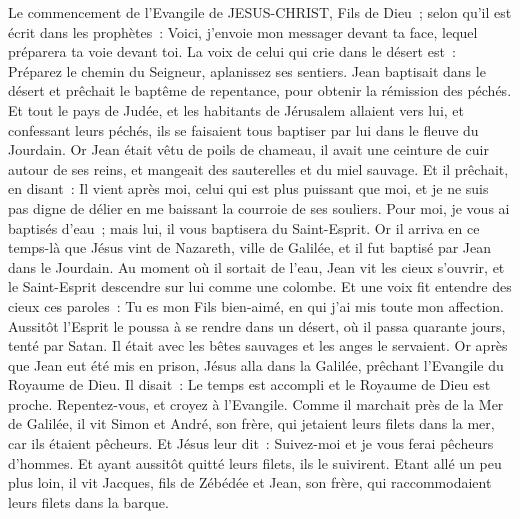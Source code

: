 \begin{multicols}{2}
\VerseOne{}Le commencement de l'Evangile de JESUS-CHRIST, Fils de Dieu~;
selon qu'il est écrit dans les prophètes~: Voici, j'envoie mon messager devant ta face, lequel préparera ta voie devant toi.
La voix de celui qui crie dans le désert est~: Préparez le chemin du Seigneur, aplanissez ses sentiers.
Jean baptisait dans le désert et prêchait le baptême de repentance, pour obtenir la rémission des péchés.
Et tout le pays de Judée, et les habitants de Jérusalem allaient vers lui, et confessant leurs péchés, ils se faisaient tous baptiser par lui dans le fleuve du Jourdain.
Or Jean était vêtu de poils de chameau, il avait une ceinture de cuir autour de ses reins, et mangeait des sauterelles et du miel sauvage.
Et il prêchait, en disant~: Il vient après moi, celui qui est plus puissant que moi, et je ne suis pas digne de délier en me baissant la courroie de ses souliers.
Pour moi, je vous ai baptisés d'eau~; mais lui, il vous baptisera du Saint-Esprit.
Or il arriva en ce temps-là que Jésus vint de Nazareth, ville de Galilée, et il fut baptisé par Jean dans le Jourdain.
Au moment où il sortait de l'eau, Jean vit les cieux s'ouvrir, et le Saint-Esprit descendre sur lui comme une colombe.
Et une voix fit entendre des cieux ces paroles~: Tu es mon Fils bien-aimé, en qui j'ai mis toute mon affection.
Aussitôt l'Esprit le poussa à se rendre dans un désert,
où il passa quarante jours, tenté par Satan. Il était avec les bêtes sauvages et les anges le servaient.
Or après que Jean eut été mis en prison, Jésus alla dans la Galilée, prêchant l'Evangile du Royaume de Dieu.
Il disait~: Le temps est accompli et le Royaume de Dieu est proche. Repentez-vous, et croyez à l'Evangile.
Comme il marchait près de la Mer de Galilée, il vit Simon et André, son frère, qui jetaient leurs filets dans la mer, car ils étaient pêcheurs.
Et Jésus leur dit~: Suivez-moi et je vous ferai pêcheurs d'hommes.
Et ayant aussitôt quitté leurs filets, ils le suivirent.
Etant allé un peu plus loin, il vit Jacques, fils de Zébédée et Jean, son frère, qui raccommodaient leurs filets dans la barque.

\end{multicols}
